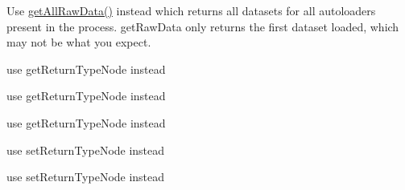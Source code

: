 \begin{DoxyRefList}
\item[Global \mbox{\hyperlink{class_composer_1_1_installed_versions_a6ecee8643c03c515b55686f03d117665}{Installed\+Versions\+::get\+Raw\+Data}} ()]\label{deprecated__deprecated000001}%
%
Use \mbox{\hyperlink{class_composer_1_1_installed_versions_a3a09ac4f4e098f4c04c31cfb88a8e256}{get\+All\+Raw\+Data()}} instead which returns all datasets for all autoloaders present in the process. get\+Raw\+Data only returns the first dataset loaded, which may not be what you expect.  
\item[Global \mbox{\hyperlink{class_prophecy_1_1_doubler_1_1_generator_1_1_node_1_1_method_node_a8d833642f3f98773f6ad2d64943be1b2}{Method\+Node\+::get\+Return\+Type}} ()]\label{deprecated__deprecated000020}%
%
use get\+Return\+Type\+Node instead  
\item[Global \mbox{\hyperlink{class_prophecy_1_1_doubler_1_1_generator_1_1_node_1_1_method_node_abb8d1cdfe9c8e404539a6ffc5572dc83}{Method\+Node\+::has\+Nullable\+Return\+Type}} ()]\label{deprecated__deprecated000021}%
%
use get\+Return\+Type\+Node instead  
\item[Global \mbox{\hyperlink{class_prophecy_1_1_doubler_1_1_generator_1_1_node_1_1_method_node_a9638837748e8f53a99d45f9a50e7eef9}{Method\+Node\+::has\+Return\+Type}} ()]\label{deprecated__deprecated000017}%
%
use get\+Return\+Type\+Node instead  
\item[Global \mbox{\hyperlink{class_prophecy_1_1_doubler_1_1_generator_1_1_node_1_1_method_node_a316a02e2c1cd4d3c4d37485701eae1fb}{Method\+Node\+::set\+Nullable\+Return\+Type}} (\$bool=true)]\label{deprecated__deprecated000019}%
%
use set\+Return\+Type\+Node instead  
\item[Global \mbox{\hyperlink{class_prophecy_1_1_doubler_1_1_generator_1_1_node_1_1_method_node_ad159af90a613282232074347398b46f0}{Method\+Node\+::set\+Return\+Type}} (\$type=null)]\label{deprecated__deprecated000018}%
%
use set\+Return\+Type\+Node instead  
\item[Global \mbox{\hyperlink{class_prophecy_1_1_prophecy_1_1_method_prophecy_a1fc42bf59d2990ffb95625672b6128db}{Method\+Prophecy\+::should\+Not\+Been\+Called}} ()]\label{deprecated__deprecated000024}%
%
 

\end{DoxyRefList}
